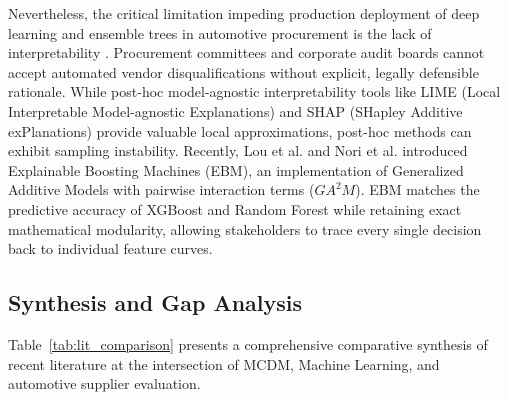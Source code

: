 \documentclass[twocolumn,10pt]{article}
\begin{document}
Nevertheless, the critical limitation impeding production deployment of deep learning and ensemble trees in automotive procurement is the lack of interpretability \cite{rudin2019stop, debnath2024automotive}. Procurement committees and corporate audit boards cannot accept automated vendor disqualifications without explicit, legally defensible rationale. While post-hoc model-agnostic interpretability tools like LIME (Local Interpretable Model-agnostic Explanations) \cite{ribeiro2016should} and SHAP (SHapley Additive exPlanations) \cite{lundberg2017unified} provide valuable local approximations, post-hoc methods can exhibit sampling instability. Recently, Lou et al. \cite{lou2013accurate} and Nori et al. \cite{nori2019interpretml} introduced Explainable Boosting Machines (EBM), an implementation of Generalized Additive Models with pairwise interaction terms ($GA^2M$). EBM matches the predictive accuracy of XGBoost and Random Forest while retaining exact mathematical modularity, allowing stakeholders to trace every single decision back to individual feature curves.

\subsection{Synthesis and Gap Analysis}
Table~\ref{tab:lit_comparison} presents a comprehensive comparative synthesis of recent literature at the intersection of MCDM, Machine Learning, and automotive supplier evaluation. 
\end{document}

